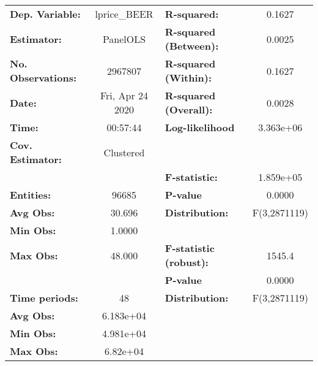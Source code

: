 \documentclass{report}
\begin{document}
\begin{center}
\begin{tabular}{lclc}
\toprule
\textbf{Dep. Variable:}       &    lprice\_BEER    & \textbf{  R-squared:         }   &      0.1627      \\
\textbf{Estimator:}           &      PanelOLS      & \textbf{  R-squared (Between):}  &      0.0025      \\
\textbf{No. Observations:}    &      2967807       & \textbf{  R-squared (Within):}   &      0.1627      \\
\textbf{Date:}                &  Fri, Apr 24 2020  & \textbf{  R-squared (Overall):}  &      0.0028      \\
\textbf{Time:}                &      00:57:44      & \textbf{  Log-likelihood     }   &    3.363e+06     \\
\textbf{Cov. Estimator:}      &     Clustered      & \textbf{                     }   &                  \\
\textbf{}                     &                    & \textbf{  F-statistic:       }   &    1.859e+05     \\
\textbf{Entities:}            &       96685        & \textbf{  P-value            }   &      0.0000      \\
\textbf{Avg Obs:}             &       30.696       & \textbf{  Distribution:      }   &   F(3,2871119)   \\
\textbf{Min Obs:}             &       1.0000       & \textbf{                     }   &                  \\
\textbf{Max Obs:}             &       48.000       & \textbf{  F-statistic (robust):} &      1545.4      \\
\textbf{}                     &                    & \textbf{  P-value            }   &      0.0000      \\
\textbf{Time periods:}        &         48         & \textbf{  Distribution:      }   &   F(3,2871119)   \\
\textbf{Avg Obs:}             &     6.183e+04      & \textbf{                     }   &                  \\
\textbf{Min Obs:}             &     4.981e+04      & \textbf{                     }   &                  \\
\textbf{Max Obs:}             &      6.82e+04      & \textbf{                     }   &                  \\
\bottomrule
\end{tabular}
\begin{tabular}{lcccccc}

\end{tabular}
\end{center}
\end{document}
